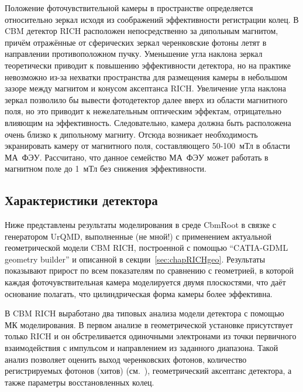 
Положение фоточувствительной камеры в пространстве определяется относительно зеркал исходя из соображений эффективности регистрации колец. В CBM детектор RICH расположен непосредственно за дипольным магнитом, причём отражённые от сферических зеркал черенковские фотоны летят в направлении противоположном пучку. Уменьшение угла наклона зеркал теоретически приводит к повышению эффективности детектора, но на практике невозможно из-за нехватки пространства для размещения камеры в небольшом зазоре между магнитом и конусом аксептанса RICH. Увеличение угла наклона зеркал позволило бы вывести фотодетектор далее вверх из области магнитного поля, но это приводит к нежелательным оптическим эффектам, отрицательно влияющим на эффективность. Следовательно, камера должна быть расположена очень близко к дипольному магниту. Отсюда возникает необходимость экранировать камеру от магнитного поля, составляющего 50-100~мТл в области МА~ФЭУ. Рассчитано, что данное семейство МА~ФЭУ может работать в магнитном поле до 1~мТл без снижения эффективности.

\subsection{Характеристики детектора}

Ниже представлены результаты моделирования в среде CbmRoot в связке с генератором UrQMD, выполненные (\todo не мной!) с применением актуальной геометрической модели CBM RICH, построенной с помощью ``CATIA-GDML geometry builder'' и описанной в секции~\ref{sec:chapRICHgeo}.
Результаты показывают прирост по всем показателям по сравнению с геометрией, в которой каждая фоточувствительная камера моделируется двумя плоскостями, что даёт основание полагать, что цилиндрическая форма камеры более эффективна.

В CBM RICH выработано два типовых анализа модели детектора с помощью МК моделирования. В первом анализе в геометрической установке присутствует только RICH и он обстреливается одиночными электронами из точки первичного взаимодействия с импульсом и направлением из заданного диапазона. Такой анализ позволяет оценить выход черенковских фотонов, количество регистрируемых фотонов (хитов) (см.~), геометрический аксептанс детектора, а также параметры восстановленных колец.

